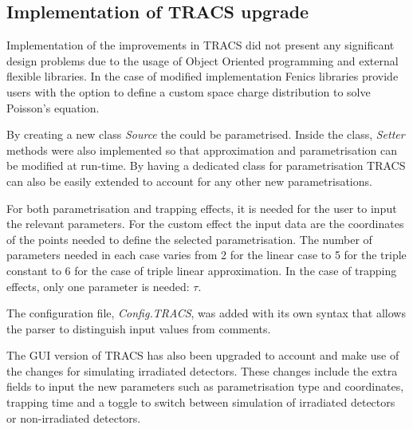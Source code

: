 \subsection{Implementation of TRACS upgrade}

Implementation of the improvements in TRACS did not present any significant design problems due to the usage of Object Oriented programming and external flexible libraries. In the case of modified \neff implementation Fenics libraries provide users with the option to define a custom space charge distribution to solve Poisson's equation. 

By creating a new class \textit{Source} the \neff could be parametrised. Inside the class, \emph{Setter} methods were also implemented so that \neff approximation and parametrisation can be modified at run-time. By having a dedicated class for \neff parametrisation TRACS can also be easily extended to account for any other new parametrisations. 


For both \neff parametrisation and trapping effects, it is needed for the user to input the relevant parameters. For the custom \neff effect the input data are the coordinates of the points needed to define the selected \neff parametrisation. The number of parameters needed in each case varies from 2 for the linear case to 5 for the triple constant \neff to 6 for the case of triple linear approximation. In the case of trapping effects, only one parameter is needed: $ \tau $.

The configuration file, \textit{Config.TRACS}, was added with its own syntax that allows the parser to distinguish input values from comments. %

The GUI version of TRACS has also been upgraded to account and make use of the changes for simulating irradiated detectors. These changes include the extra fields to input the new parameters such as \neff parametrisation type and coordinates, trapping time and a toggle to switch between simulation of irradiated detectors or non-irradiated detectors. 

